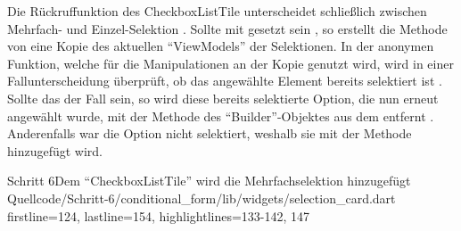 Die Rückruffunktion  des CheckboxListTile unterscheidet schließlich zwischen Mehrfach- und Einzel-Selektion \Lst{\ref{lst:Schritt6CheckboxListTile}}.
Sollte  mit  gesetzt sein , so erstellt die Methode  von  eine Kopie des aktuellen \enquote{ViewModels} der Selektionen.
In der anonymen Funktion,
welche für die Manipulationen an der Kopie genutzt wird,
wird in einer Fallunterscheidung überprüft,
ob das angewählte Element bereits selektiert ist .
Sollte das der Fall sein,
so wird diese bereits selektierte Option, die nun erneut angewählt wurde, mit der Methode  des \enquote{Builder}-Objektes aus dem  entfernt .
Anderenfalls war die Option nicht selektiert, weshalb sie mit der Methode  hinzugefügt wird. 


\begin{alexlisting}{Schritt 6}{Dem \enquote{CheckboxListTile} wird die Mehrfachselektion hinzugefügt}
  {Quellcode/Schritt-6/conditional_form/lib/widgets/selection_card.dart}
  {firstline=124, lastline=154, highlightlines={133-142, 147}}
  \label{lst:Schritt6CheckboxListTile}
\end{alexlisting}